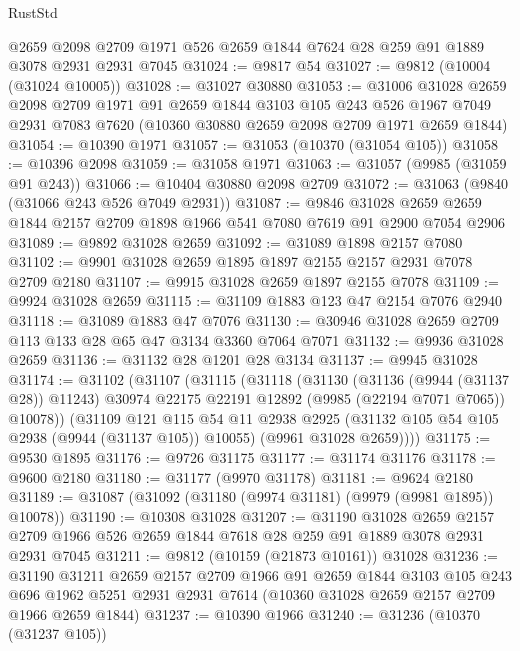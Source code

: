 \begin{lexlean}{RustStd}
\begin{coremodule}
    @2659
    @2098
    @2709
    @1971
    @526
    @2659
    @1844
    @7624
    @28
    @259
    @91
    @1889
    @3078
    @2931
    @2931
    @7045
@31024 := @9817 @54
@31027 := @9812 (@10004 (@31024 @10005))
@31028 := @31027 @30880
@31053 := @31006
    @31028
    @2659
    @2098
    @2709
    @1971
    @91
    @2659
    @1844
    @3103
    @105
    @243
    @526
    @1967
    @7049
    @2931
    @7083
    @7620
    (@10360 @30880 @2659 @2098 @2709 @1971 @2659 @1844)
@31054 := @10390 @1971
@31057 := @31053 (@10370 (@31054 @105))
@31058 := @10396 @2098
@31059 := @31058 @1971
@31063 := @31057 (@9985 (@31059 @91 @243))
@31066 := @10404 @30880 @2098 @2709
@31072 := @31063 (@9840 (@31066 @243 @526 @7049 @2931))
@31087 := @9846
    @31028
    @2659
    @2659
    @1844
    @2157
    @2709
    @1898
    @1966
    @541
    @7080
    @7619
    @91
    @2900
    @7054
    @2906
@31089 := @9892 @31028 @2659
@31092 := @31089 @1898 @2157 @7080
@31102 := @9901 @31028 @2659 @1895 @1897 @2155 @2157 @2931 @7078 @2709 @2180
@31107 := @9915 @31028 @2659 @1897 @2155 @7078
@31109 := @9924 @31028 @2659
@31115 := @31109 @1883 @123 @47 @2154 @7076 @2940
@31118 := @31089 @1883 @47 @7076
@31130 := @30946 @31028 @2659 @2709 @113 @133 @28 @65 @47 @3134 @3360 @7064 @7071
@31132 := @9936 @31028 @2659
@31136 := @31132 @28 @1201 @28 @3134
@31137 := @9945 @31028
@31174 := @31102
    (@31107
      (@31115
        (@31118
          (@31130
            (@31136 (@9944 (@31137 @28)) @11243)
            @30974
            @22175
            @22191
            @12892
            (@9985 (@22194 @7071 @7065))
            @10078))
        (@31109
          @121
          @115
          @54
          @11
          @2938
          @2925
          (@31132 @105 @54 @105 @2938 (@9944 (@31137 @105)) @10055)
          (@9961 @31028 @2659))))
@31175 := @9530 @1895
@31176 := @9726 @31175
@31177 := @31174 @31176
@31178 := @9600 @2180
@31180 := @31177 (@9970 @31178)
@31181 := @9624 @2180
@31189 := @31087 (@31092 (@31180 (@9974 @31181) (@9979 (@9981 @1895)) @10078))
@31190 := @10308 @31028
@31207 := @31190
    @31028
    @2659
    @2157
    @2709
    @1966
    @526
    @2659
    @1844
    @7618
    @28
    @259
    @91
    @1889
    @3078
    @2931
    @2931
    @7045
@31211 := @9812 (@10159 (@21873 @10161)) @31028
@31236 := @31190
    @31211
    @2659
    @2157
    @2709
    @1966
    @91
    @2659
    @1844
    @3103
    @105
    @243
    @696
    @1962
    @5251
    @2931
    @2931
    @7614
    (@10360 @31028 @2659 @2157 @2709 @1966 @2659 @1844)
@31237 := @10390 @1966
@31240 := @31236 (@10370 (@31237 @105))

\end{coremodule}
\end{lexlean}

